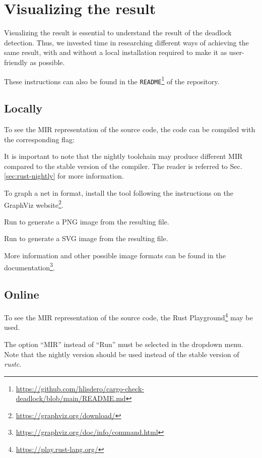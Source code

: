 \section{Visualizing the result}
\label{sec:visualizing-results}

Visualizing the result is essential to understand the result of the deadlock detection.
Thus, we invested time in researching different ways of achieving the same result,
with and without a local installation required to make it as user-friendly as possible.

These instructions can also be found in the
\texttt{README}\footnote{\url{https://github.com/hlisdero/cargo-check-deadlock/blob/main/README.md}}
of the repository.

\subsection{Locally}

To see the \acrshort{MIR} representation of the source code, the code can be compiled
with the corresponding flag: 

It is important to note that the nightly toolchain may produce different \acrshort{MIR}
compared to the stable version of the compiler.
The reader is referred to Sec. \ref{sec:rust-nightly} for more information.

To graph a net in  format, install the  tool
following the instructions on the GraphViz website\footnote{\url{https://graphviz.org/download/}}.

Run 
to generate a PNG image from the resulting  file.

Run 
to generate a SVG image from the resulting  file.

More information and other possible image formats can be found
in the documentation\footnote{\url{https://graphviz.org/doc/info/command.html}}.

\subsection{Online}

To see the \acrshort{MIR} representation of the source code,
the Rust Playground\footnote{\url{https://play.rust-lang.org/}} may be used.

The option ``MIR'' instead of ``Run'' must be selected in the dropdown menu.
Note that the nightly version should be used instead of the stable version of \emph{rustc}.

